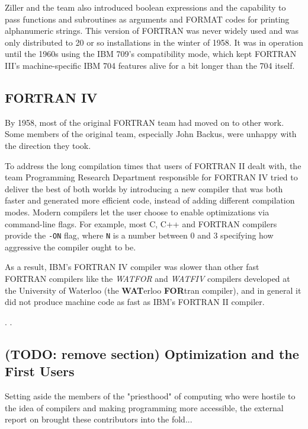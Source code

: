 Ziller and the team also introduced boolean expressions and the capability to
pass functions and subroutines as arguments and FORMAT codes for printing
alphanumeric strings.
This version of FORTRAN was never widely used and was only distributed to
20 or so installations in the winter of 1958.
It was in operation until the 1960s using the IBM 709's compatibility mode,
which kept FORTRAN III's machine-specific IBM 704 features alive for a bit longer
than the 704 itself.

\subsection{FORTRAN IV}

By 1958, most of the original FORTRAN team had moved on to other work.
Some members of the original team, especially John Backus, were unhappy with
the direction they took.

To address the long compilation times that users of FORTRAN II dealt with,
the team Programming Research Department responsible for FORTRAN IV
tried to deliver the best of both worlds by introducing a new compiler
that was both faster and generated more efficient code, instead of adding
different compilation modes. Modern compilers let the user choose to enable
optimizations via command-line flags. For example, most C, C++ and FORTRAN compilers
provide the \texttt{-ON} flag, where \texttt{N} is a number
between 0 and 3 specifying how aggressive the compiler ought to be.

As a result, IBM's FORTRAN IV compiler was slower than other fast FORTRAN compilers
like the \textit{WATFOR} and \textit{WATFIV} compilers developed at the University of Waterloo
(the \textbf{WAT}erloo \textbf{FOR}tran compiler\cite{cress_dirksen_graham_watfor_fortran_iv_1970}),
and in general it did not produce machine code as fast as IBM's FORTRAN II compiler.


.
\cite{backus_heising_fortran_1964}.


\subsection{(TODO: remove section) Optimization and the First Users}

Setting aside the members of the "priesthood" of computing who were hostile to
the idea of compilers and making programming more accessible, the external
report on \FTN{} brought these contributors into the fold...

